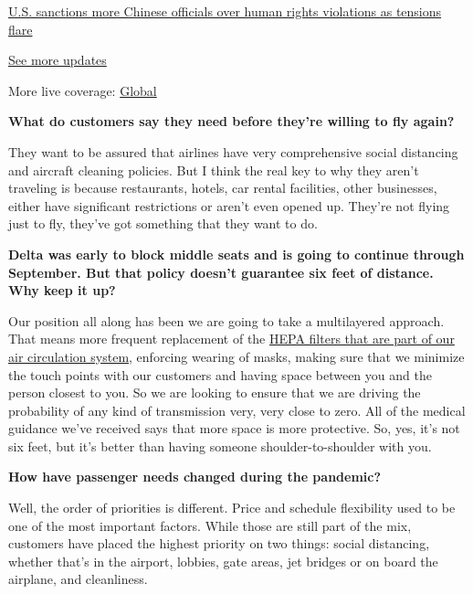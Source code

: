 \href{https://www.nytimes.com/live/2020/07/31/business/stock-market-today-coronavirus?action=click\&pgtype=Article\&state=default\&region=MAIN_CONTENT_1\&context=storylines_live_updates\#us-sanctions-more-chinese-officials-over-human-rights-violations-as-tensions-flare}{U.S.
sanctions more Chinese officials over human rights violations as
tensions flare}

\href{https://www.nytimes.com/live/2020/07/31/business/stock-market-today-coronavirus?action=click\&pgtype=Article\&state=default\&region=MAIN_CONTENT_1\&context=storylines_live_updates}{See
more updates}

More live coverage:
\href{https://www.nytimes.com/2020/08/01/world/coronavirus-covid-19.html?action=click\&pgtype=Article\&state=default\&region=MAIN_CONTENT_1\&context=storylines_live_updates}{Global}

\textbf{What do customers say they need before they're willing to fly
again?}

They want to be assured that airlines have very comprehensive social
distancing and aircraft cleaning policies. But I think the real key to
why they aren't traveling is because restaurants, hotels, car rental
facilities, other businesses, either have significant restrictions or
aren't even opened up. They're not flying just to fly, they've got
something that they want to do.

\textbf{Delta was early to block middle seats and is going to continue
through September. But that policy doesn't guarantee six feet of
distance. Why keep it up?}

Our position all along has been we are going to take a multilayered
approach. That means more frequent replacement of the
\href{https://www.nytimes.com/2020/04/30/business/airlines-masks-coronavirus-passengers.html}{HEPA
filters that are part of our air circulation system}, enforcing wearing
of masks, making sure that we minimize the touch points with our
customers and having space between you and the person closest to you. So
we are looking to ensure that we are driving the probability of any kind
of transmission very, very close to zero. All of the medical guidance
we've received says that more space is more protective. So, yes, it's
not six feet, but it's better than having someone shoulder-to-shoulder
with you.

\textbf{How have passenger needs changed during the pandemic?}

Well, the order of priorities is different. Price and schedule
flexibility used to be one of the most important factors. While those
are still part of the mix, customers have placed the highest priority on
two things: social distancing, whether that's in the airport, lobbies,
gate areas, jet bridges or on board the airplane, and cleanliness.

